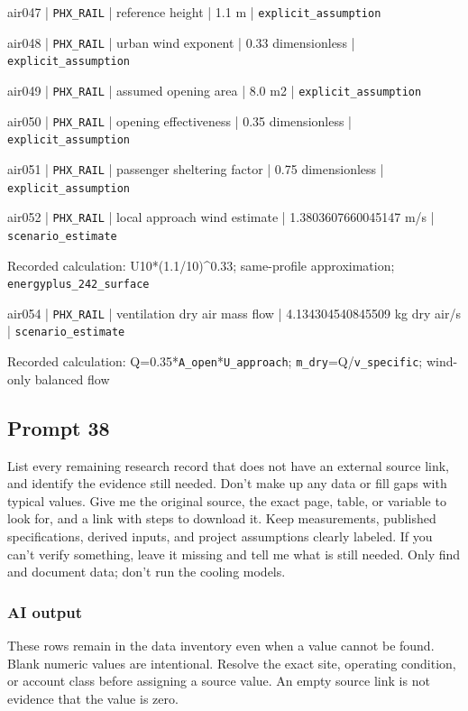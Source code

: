 air047 | \nolinkurl{PHX_RAIL} | reference height | 1.1 m | \nolinkurl{explicit_assumption}

air048 | \nolinkurl{PHX_RAIL} | urban wind exponent | 0.33 dimensionless | \nolinkurl{explicit_assumption}

air049 | \nolinkurl{PHX_RAIL} | assumed opening area | 8.0 m2 | \nolinkurl{explicit_assumption}

air050 | \nolinkurl{PHX_RAIL} | opening effectiveness | 0.35 dimensionless | \nolinkurl{explicit_assumption}

air051 | \nolinkurl{PHX_RAIL} | passenger sheltering factor | 0.75 dimensionless | \nolinkurl{explicit_assumption}

air052 | \nolinkurl{PHX_RAIL} | local approach wind estimate | 1.3803607660045147 m/s | \nolinkurl{scenario_estimate}

Recorded calculation: U10*(1.1/10)\textasciicircum{}0.33; same-profile approximation; \nolinkurl{energyplus_242_surface}

air054 | \nolinkurl{PHX_RAIL} | ventilation dry air mass flow | 4.134304540845509 kg dry air/s | \nolinkurl{scenario_estimate}

Recorded calculation: Q=0.35*\nolinkurl{A_open}*\nolinkurl{U_approach}; \nolinkurl{m_dry}=Q/\nolinkurl{v_specific}; wind-only balanced flow

\subsection*{Prompt 38}
List every remaining research record that does not have an external source link, and identify the evidence still needed. Don’t make up any data or fill gaps with typical values. Give me the original source, the exact page, table, or variable to look for, and a link with steps to download it. Keep measurements, published specifications, derived inputs, and project assumptions clearly labeled. If you can’t verify something, leave it missing and tell me what is still needed. Only find and document data; don’t run the cooling models.

\subsubsection*{AI output}
These rows remain in the data inventory even when a value cannot be found. Blank numeric values are intentional. Resolve the exact site, operating condition, or account class before assigning a source value. An empty source link is not evidence that the value is zero.

